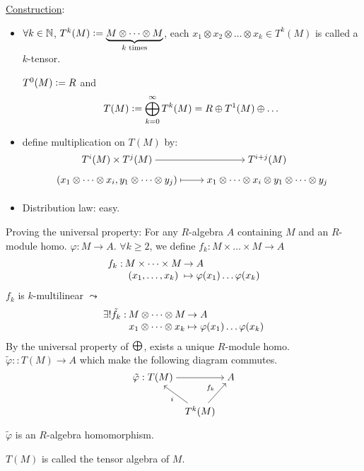 \underline{Construction}:
\begin{itemize}
  \item $\forall k \in \mathbb{N}$, $T^k(M) \vcentcolon=
    \underbrace{M\otimes \dots \otimes M}_{k \text{~times}}$, each
    $x_1\otimes x_2\otimes \dots \otimes x_k \in T^k(M)$ is called a $k$-tensor.

    $T^0(M) \vcentcolon= R$ and
    \[
      T(M) \vcentcolon= \bigoplus_{k=0}^\infty T^k(M) = R \oplus T^1(M) \oplus \dots
    \]
  \item define multiplication on $T(M)$ by:
    \[
      \begin{tikzcd}[cramped, row sep=tiny]
        T^i(M) \times T^j(M) \arrow[r] & T^{i+j}(M) \\
        (x_1\otimes \dots \otimes x_i, y_1\otimes \dots \otimes y_j)
        \arrow[r, mapsto]
        & x_1\otimes \dots \otimes x_i\otimes y_1\otimes \dots\otimes y_j \\
      \end{tikzcd}
    \]
  \item Distribution law: easy.
\end{itemize}

Proving the universal property:
For any $R$-algebra $A$ containing $M$ and an $R$-module homo.
$\varphi: M \to A$.
$\forall k \ge 2$, we define
$f_k: M \times \dots \times M \to A$
\[
  \arraycolsep=1pt
  \begin{array}{rcl}
    f_k: & M \times \dots \times M & \to A \\
         & (x_1, \dots, x_k) & \mapsto
    \varphi(x_1) \dots \varphi(x_k)
  \end{array}
\]
$f_k$ is $k$-multilinear $\leadsto$
\[
  \arraycolsep=1pt
  \begin{array}{rcl}
    \exists! \tilde{f_k}: & M \otimes \dots \otimes M & \to A \\
         & x_1 \otimes \dots\otimes x_k & \mapsto
    \varphi(x_1) \dots \varphi(x_k)
  \end{array}
\]
By the universal property of $\bigOp$, exists a unique $R$-module homo.
$\tilde\varphi :: T(M) \to A$ which make the following diagram commutes.
\[
  \begin{tikzcd}[cramped, column sep=tiny]
    \tilde\varphi: T(M) \arrow{rr} & & A \\
      & T^k(M) \arrow{ul}{i} \arrow{ur}{f_k} &
  \end{tikzcd}
\]

$\tilde\varphi$ is an $R$-algebra homomorphism.

\begin{definition}
  $T(M)$ is called the tensor algebra of $M$.
\end{definition}

